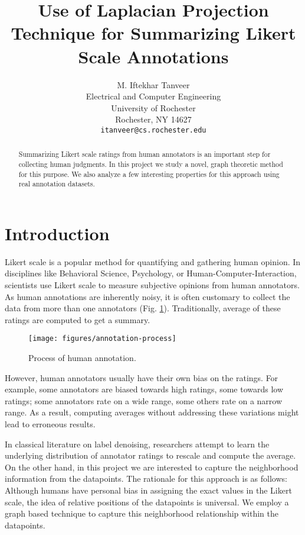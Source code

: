 \documentclass{article} \usepackage{nips14submit_e,times}
\title{Use of Laplacian Projection Technique for Summarizing Likert Scale Annotations}
\author{
M. Iftekhar Tanveer\\
Electrical and Computer Engineering\\
University of Rochester\\
Rochester, NY 14627 \\
\texttt{itanveer@cs.rochester.edu}
}
\begin{document}
\maketitle

\begin{abstract}
  Summarizing Likert scale ratings from human annotators is an important step for collecting human judgments. In this project we study a novel, graph theoretic method for this purpose. We also analyze a few interesting properties for this approach using real annotation datasets.
\end{abstract}



\section{Introduction}
\label{sec:intro}
Likert scale is a popular method for quantifying and gathering human opinion. In disciplines like Behavioral Science, Psychology, or Human-Computer-Interaction, scientists use Likert scale to measure subjective opinions from human annotators. As human annotations are inherently noisy, it is often customary to collect the data from more than one annotators (Fig. \ref{Fig:annotation}). Traditionally, average of these ratings are computed to get a summary.
\begin{figure}[h]
\begin{center}
\texttt{[image: figures/annotation-process]}
\end{center}
\label{Fig:annotation}
\caption{Process of human annotation.}
\end{figure}

However, human annotators usually have their own bias on the ratings. For example, some annotators are biased towards high ratings, some towards low ratings; some annotators rate on a wide range, some others rate on a narrow range. As a result, computing averages without addressing these variations might lead to erroneous results. 

In classical literature on label denoising, researchers attempt to learn the underlying distribution of annotator ratings to rescale and compute the average. On the other hand, in this project we are interested to capture the neighborhood information from the datapoints. The rationale for this approach is as follows: Although humans have personal bias in assigning the exact values in the Likert scale, the idea of relative positions of the datapoints is universal. We employ a graph based technique to capture this neighborhood relationship within the datapoints.
\end{document}
